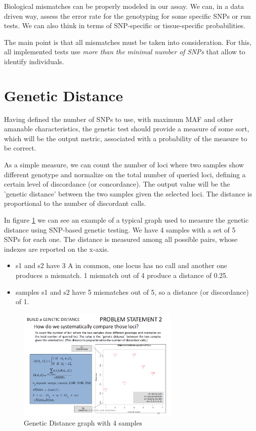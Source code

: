 \bigskip
Biological mismatches can be properly modeled in our assay. We can, in a data driven way, assess the error rate for the genotyping for some specific SNPs or run tests. We can also think in terms of SNP-specific or tissue-specific probabilities.

The main point is that all mismatches must be taken into consideration. 
For this, all implemented tests use \emph{more than the minimal number of SNPs} that allow to identify individuals. 


\section*{Genetic Distance}

Having defined the number of SNPs to use, with maximum MAF and other amanable characteristics, the genetic test should provide a measure of some sort, which will be the output metric, associated with a probability of the measure to be correct. 

As a simple measure, we can count the number of loci where two samples show different genotype and normalize on the total number of queried loci, defining a certain level of discordance (or concordance). The output value will be the 'genetic distance' between the two samples given the selected loci. The distance is proportional to the number of discordant calls.

In figure \ref{fig:Distance} we can see an example of a typical graph used to measure the genetic distance using SNP-based genetic testing. We have 4 samples with a set of 5 SNPs for each one. The distance is measured among all possible pairs, whose indexes are reported on the x-axis. 
\begin{itemize}
	\item s1 and s2 have 3 A in common, one locus has no call and another one produces a mismatch. 1 mismatch out of 4 produce a distance of 0.25.
	\item samples s1 and s2 have 5 mismatches out of 5, so a distance (or discordance) of 1. 
\end{itemize}

\begin{figure}
	\centering
	\includegraphics[width=0.7\textwidth]{Distance.PNG}
	\caption{\label{fig:Distance}Genetic Distance graph with 4 samples}
\end{figure}

